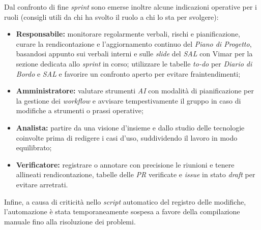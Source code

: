 \documentclass[11pt, a4paper]{article}
\begin{document}
	Dal confronto di fine \textit{sprint} sono emerse inoltre alcune indicazioni operative per i ruoli (consigli utili da chi ha svolto il ruolo a chi lo sta per svolgere):
	\begin{itemize}
		\item \textbf{Responsabile:} monitorare regolarmente verbali, rischi e pianificazione, curare la rendicontazione e l'aggiornamento continuo del \textit{Piano di Progetto}, basandosi appunto sui verbali interni e sulle \textit{slide} del \textit{SAL} con Vimar per la sezione dedicata allo \textit{sprint} in corso; utilizzare le tabelle \textit{to-do} per \textit{Diario di Bordo} e \textit{SAL} e favorire un confronto aperto per evitare fraintendimenti;
		\item \textbf{Amministratore:} valutare strumenti \textit{AI} con modalità di pianificazione per la gestione dei \textit{workflow} e avvisare tempestivamente il gruppo in caso di modifiche a strumenti o prassi operative;
		\item \textbf{Analista:} partire da una visione d'insieme e dallo studio delle tecnologie coinvolte prima di redigere i casi d'uso, suddividendo il lavoro in modo equilibrato;
		\item \textbf{Verificatore:} registrare o annotare con precisione le riunioni e tenere allineati rendicontazione, tabelle delle \textit{PR} verificate e \textit{issue} in stato \textit{draft} per evitare arretrati.
	\end{itemize}
	
	Infine, a causa di criticità nello \textit{script} automatico del registro delle modifiche, l'automazione è stata temporaneamente sospesa a favore della compilazione manuale fino alla risoluzione dei problemi.
	
	
\end{document}
